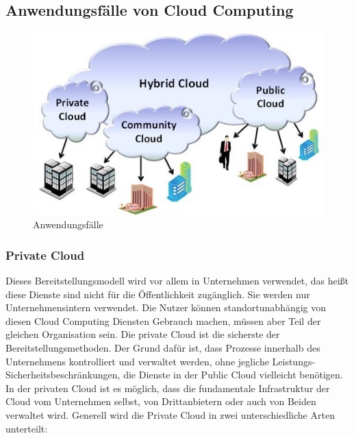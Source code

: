 \subsection{Anwendungsfälle von Cloud Computing}

\begin{figure}[h]
    \centering
    \includegraphics[scale=1]{sections/cloud-computing/images/cc-use-cases.png}
    \caption{Anwendungsfälle}
\end{figure}

\subsubsection{Private Cloud}

Dieses Bereitstellungsmodell wird vor allem in Unternehmen verwendet, das heißt diese Dienste sind nicht für die Öffentlichkeit zugänglich. Sie werden nur Unternehmensintern verwendet. Die Nutzer können standortunabhängig von diesen Cloud Computing Diensten Gebrauch machen, müssen aber Teil der gleichen Organisation sein. Die private Cloud ist die sicherste der Bereitstellungsmethoden. Der Grund dafür ist, dass Prozesse innerhalb des Unternehmens kontrolliert und verwaltet werden, ohne jegliche Leistungs- Sicherheitsbeschränkungen, die Dienste in der Public Cloud vielleicht benötigen. In der privaten Cloud ist es möglich, dass die fundamentale Infrastruktur der Cloud vom Unternehmen selbst, von Drittanbietern oder auch von Beiden verwaltet wird. Generell wird die Private Cloud in zwei unterschiedliche Arten unterteilt:

